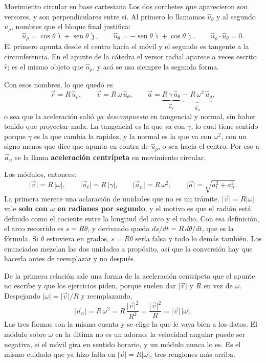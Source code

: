 \documentclass[11pt,openany]{book}
\newcommand{\sen}{\operatorname{sen}}
\begin{document}
\begin{bloque}{Movimiento circular en base cartesiana}
Los dos corchetes que aparecieron son versores, y son perpendiculares entre sí. Al primero lo llamamos $\hat u_\theta$ y al segundo $\hat u_\rho$, nombres que el bloque final justifica:
\[
\hat u_\rho = \cos\theta\,\hat\imath + \sen\theta\,\hat\jmath, \qquad
\hat u_\theta = -\sen\theta\,\hat\imath + \cos\theta\,\hat\jmath,
\qquad \hat u_\rho\cdot\hat u_\theta = 0.
\]
El primero apunta desde el centro hacia el móvil y el segundo es tangente a la circunferencia. En el apunte de la cátedra el versor radial aparece a veces escrito $\hat r$; es el mismo objeto que $\hat u_\rho$, y acá se usa siempre la segunda forma.

Con esos nombres, lo que quedó es
\[
\vec r = R\,\hat u_\rho, \qquad
\vec v = R\,\omega\,\hat u_\theta, \qquad
\vec a = \underbrace{R\,\gamma\,\hat u_\theta}_{\vec a_t} \;\underbrace{-\;R\,\omega^2\,\hat u_\rho}_{\vec a_n},
\]
o sea que la aceleración salió \emph{ya descompuesta} en tangencial y normal, sin haber tenido que proyectar nada. La tangencial es la que va con $\gamma$, lo cual tiene sentido porque $\gamma$ es la que cambia la rapidez, y la normal es la que va con $\omega^2$, con un signo menos que dice que apunta en contra de $\hat u_\rho$, o sea hacia el centro. Por eso a $\vec a_n$ se la llama \textbf{aceleración centrípeta} en movimiento circular.

Los módulos, entonces:
\[
\lvert\vec v\rvert = R\,\lvert\omega\rvert, \qquad
\lvert\vec a_t\rvert = R\,\lvert\gamma\rvert, \qquad
\lvert\vec a_n\rvert = R\,\omega^2, \qquad
\lvert\vec a\rvert = \sqrt{a_t^2+a_n^2}.
\]
La primera merece una aclaración de unidades que no es un trámite. $\lvert\vec v\rvert = R\lvert\omega\rvert$ vale \textbf{solo con $\omega$ en radianes por segundo}, y el motivo es que el radián está definido como el cociente entre la longitud del arco y el radio. Con esa definición, el arco recorrido es $s = R\theta$, y derivando queda $ds/dt = R\,d\theta/dt$, que es la fórmula. Si $\theta$ estuviera en grados, $s = R\theta$ sería falsa y todo lo demás también. Los enunciados mezclan las dos unidades a propósito, así que la conversión hay que hacerla antes de reemplazar y no después.

De la primera relación sale una forma de la aceleración centrípeta que el apunte no escribe y que los ejercicios piden, porque suelen dar $\lvert\vec v\rvert$ y $R$ en vez de $\omega$. Despejando $\lvert\omega\rvert = \lvert\vec v\rvert/R$ y reemplazando,
\[
\lvert\vec a_n\rvert = R\,\omega^2 = R\,\frac{\lvert\vec v\rvert^2}{R^2} = \frac{\lvert\vec v\rvert^2}{R} = \lvert\vec v\rvert\,\lvert\omega\rvert.
\]
Las tres formas son la misma cuenta y se elige la que le vaya bien a los datos. El módulo sobre $\omega$ en la última no es un adorno: la velocidad angular puede ser negativa, si el móvil gira en sentido horario, y un módulo nunca lo es. Es el mismo cuidado que ya hizo falta en $\lvert\vec v\rvert = R\lvert\omega\rvert$, tres renglones más arriba.


\end{bloque}
\end{document}
